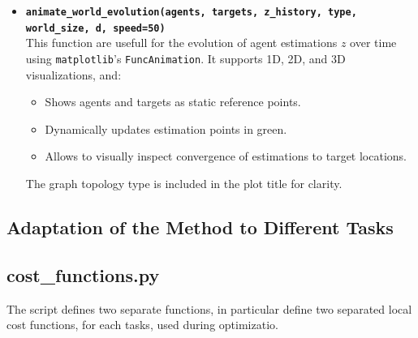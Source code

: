 \begin{itemize}
    \item \textbf{\texttt{animate\_world\_evolution(agents, targets, z\_history, type, world\_size, d, speed=50)}}\\
    This function are usefull for the evolution of agent estimations $z$ over time using \texttt{matplotlib}'s \texttt{FuncAnimation}. It supports 1D, 2D, and 3D visualizations, and:
    \begin{itemize}
        \item Shows agents and targets as static reference points.
        \item Dynamically updates estimation points in green.
        \item Allows to visually inspect convergence of estimations to target locations.
    \end{itemize}
    The graph topology type is included in the plot title for clarity.
\end{itemize}

\subsection{Adaptation of the Method to Different Tasks}

\subsection*{\textbf{cost\_functions.py}}

The script defines two separate functions, in particular define two separated local cost functions, for each tasks, used during optimizatio. 




